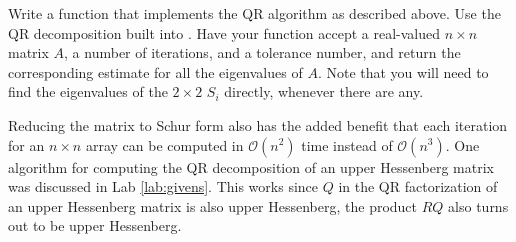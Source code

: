 \begin{problem}
Write a function  that implements the QR algorithm as described above. Use the QR decomposition built into .
Have your function accept a real-valued $n \times n$ matrix $A$, a number of iterations, and a tolerance number,
and return the corresponding estimate for all the eigenvalues of $A$.
Note that you will need to find the eigenvalues of the $2 \times 2$ $S_i$ directly, whenever there are any.
\end{problem}

Reducing the matrix to Schur form also has the added benefit that each iteration for an $n \times n$ array can be computed in $\mathcal{O} \left( n^2 \right)$ time instead of $\mathcal{O} \left( n^3 \right)$.
One algorithm for computing the QR decomposition of an upper Hessenberg matrix was discussed in Lab \ref{lab:givens}.
This works since $Q$ in the QR factorization of an upper Hessenberg matrix is also upper Hessenberg, the product $R Q$ also turns out to be upper Hessenberg.

